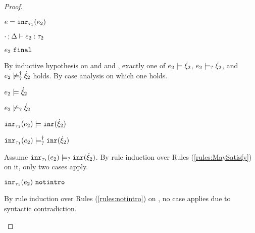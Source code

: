 \begin{proof}
\begin{byCases}
\begin{byCases}
    \item[\text{(\ref{rule:TInr})}]
        \begin{pfsteps*}
        \item $e=\mathtt{inr}_{\tau_1}({e_2})$ 
        \item $\cdot \mathbin{;} \Delta \vdash e_2 : \tau_2$  
        \item $e_2 ~\mathtt{final}$  
        \end{pfsteps*}
        By inductive hypothesis on  and  and , exactly one of $e_2 \models \dot{\xi}_2$, $e_2 \models_{?} \dot{\xi}_2$, and $e_2 \not\models_{?}^{\dag} \dot{\xi}_2$ holds. By case analysis on which one holds.
        \begin{byCases}
        \item[\csatisfy{e_2}{\hxi_2}]
            \begin{pfsteps*}
            \item $e_2 \models \dot{\xi}_2$  
            \item $e_2 \not\models_{?} \dot{\xi}_2$  
            \item $\mathtt{inr}_{\tau_1}({e_2}) \models \mathtt{inr}(\dot{\xi}_2)$  
            \item $\mathtt{inr}_{\tau_1}({e_2}) \models_{?}^{\dag} \mathtt{inr}(\dot{\xi}_2)$ 
            \end{pfsteps*}
            Assume $\mathtt{inr}_{\tau_1}({e_2}) \models_{?} \mathtt{inr}(\dot{\xi}_2)$. By rule induction over Rules (\ref{rules:MaySatisfy}) on it, only two cases apply.
            \begin{byCases}
            \item[\text{(\ref{rule:CMSNotIntro})}]
                \begin{pfsteps*}
                \item $\mathtt{inr}_{\tau_1}({e_2}) ~\mathtt{notintro}$  
                \end{pfsteps*}
                By rule induction over Rules (\ref{rules:notintro}) on , no case applies due to syntactic contradiction.
            \item[\text{(\ref{rule:CMSInr})}]

\end{byCases}
\end{byCases}
\end{byCases}
\end{byCases}
\end{proof}
